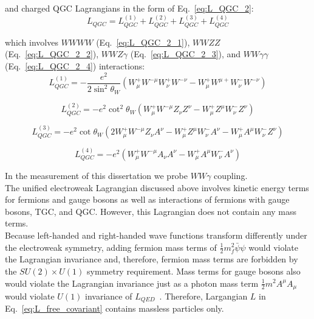 and charged QGC Lagrangians in the form of Eq.~\ref{eq:L_QGC_2}:\\


\begin{equation} \label{eq:L_QGC_2}
L_{QGC} = L_{QGC}^{(1)} + L_{QGC}^{(2)} + L_{QGC}^{(3)} + L_{QGC}^{(4)}
\end{equation}

which involves $WWWW$ (Eq.~\ref{eq:L_QGC_2_1}), $WWZZ$ (Eq.~\ref{eq:L_QGC_2_2}), $WWZ\gamma$ (Eq.~\ref{eq:L_QGC_2_3}), and $WW\gamma\gamma$ (Eq.~\ref{eq:L_QGC_2_4}) interactions:\\

\begin{equation} \label{eq:L_QGC_2_1}
L_{QGC}^{(1)} = -\frac{e^2}{2\sin^2 \theta_W}(W^+_\mu W^{-\mu}W^+_\nu W^{-\nu} - W^+_\mu W^{\mu +} W^-_\nu W^{-\nu})
\end{equation}

\begin{equation} \label{eq:L_QGC_2_2}
L_{QGC}^{(2)} = - e^2 \cot^2 \theta_W (W^+_\mu W^{-\mu} Z_\nu Z^{\nu} - W^+_\mu Z^{\mu} W^-_\nu Z^{\nu})
\end{equation}

\begin{equation} \label{eq:L_QGC_2_3}
L_{QGC}^{(3)} = - e^2 \cot \theta_W (2 W_\mu^+ W^{-\mu} Z_\nu A^{\nu} - W^{+}_\mu Z^\mu W^-_\nu A^\nu - W^{+}_\mu A^\mu W^-_\nu Z^\nu)
\end{equation}

\begin{equation} \label{eq:L_QGC_2_4}
L_{QGC}^{(4)} = - e^2 (W^+_\mu W^{-\mu} A_\nu A^{\nu} - W^+_\mu A^{\mu} W^-_\nu A^{\nu})
\end{equation}

In the measurement of this dissertation we probe $WW\gamma$ coupling.\\

The unified electroweak Lagrangian discussed above involves kinetic energy terms for fermions and gauge bosons as well as interactions of fermions with gauge bosons, TGC, and QGC. However, this Lagrangian does not contain any mass terms.\\

Because left-handed and right-handed wave functions transform differently under the electroweak symmetry, adding fermion mass terms of $\frac{1}{2} m_f^2 \bar{\psi} \psi$ would violate the Lagrangian invariance and, therefore, fermion mass terms are forbidden by the $SU(2) \times U(1)$ symmetry requirement. Mass terms for gauge bosons also would violate the Lagrangian invariance just as a photon mass term $\frac{1}{2} m^2 A^\mu A_\mu$ would violate $U(1)$ invariance of $L_{QED}$~\cite{ref_Griffiths}. Therefore, Largangian $L$ in Eq.~\ref{eq:L_free_covariant} contains massless particles only.\\

